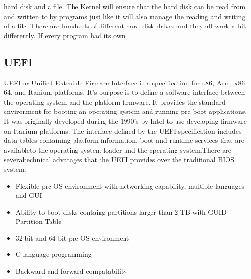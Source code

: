 hard disk and a
file. The Kernel will ensure that the hard disk can be read from and written
to by programs just like it will also manage the reading and writing of a
file. There are hundreds of different hard disk drives and they all work a
bit differently. If every program had its own 

\subsection{UEFI}

UEFI or Unified Extesible Firmare Interface is a specification for x86, Arm, x86-64, and Itanium platforms. It's purpose is to define a
software interface between the operating system and the platform firmware. It provides the standard environment for booting an 
operating system and running pre-boot applications. It was originally developed during the 1990's by Intel to use developing firmware
on Itanium platforms. The interface defined by the UEFI specification includes data tables containing platform information, boot and runtime services that are availableto the operating system loader and the operating system.There are  severaltechnical advatages that
the UEFI provides over the traditional BIOS system: 

\begin{itemize}

\item Flexible pre-OS environment with networking capability, multiple languages and GUI
\item Ability to boot disks containg partitions larger than 2 TB with GUID Partition Table
\item 32-bit and 64-bit pre OS environment
\item C language programming
\item Backward and forward compatability

\end{itemize}
